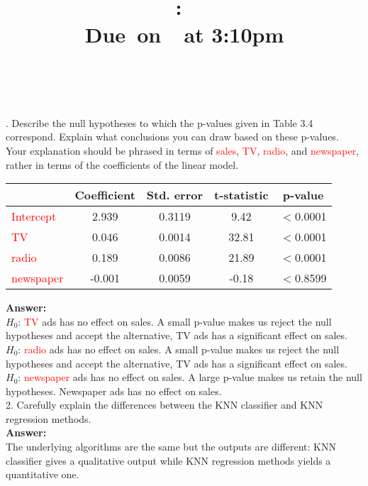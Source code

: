 \documentclass[12pt]{article}
\title{
    \vspace{2in}
    \textmd{\textbf{\hmwkClass:\ \hmwkTitle}}\\
    \normalsize\vspace{0.1in}\small{Due\ on\ \hmwkDueDate\ at 3:10pm}\\
    \vspace{0.1in}\large{\textit{\hmwkClassInstructor\ \hmwkClassTime}}
    \vspace{3in}
}
\author{\textbf{\hmwkAuthorName}}
\date{}
\begin{document}
\maketitle

. Describe the null hypotheses to which the p-values given in Table 3.4 correspond. Explain what conclusions you can draw based on these p-values. Your explanation should be phrased in terms of  \textcolor{red} {sales},  \textcolor{red} {TV}, \textcolor{red} {radio}, and  \textcolor{red} {newspaper}, rather in terms of the coefficients of the linear model. \\

\begin{table}[ht]
\centering
\begin{tabular}{  l | c | c | c |c}
\hline
& Coefficient&Std. error &t-statistic&p-value\\
\hline 
\textcolor{red}{Intercept}& 2.939&0.3119&9.42& $<$0.0001\\
\textcolor{red}{TV}& 0.046&0.0014&32.81& $<$0.0001\\
\textcolor{red}{radio}& 0.189&0.0086&21.89& $<$0.0001\\
\textcolor{red}{newspaper}& -0.001&0.0059&-0.18& $<$0.8599\\
\hline                    
\end{tabular}
\end{table}
\textbf{Answer:}\\      
$H_0$: \textcolor{red}{TV} ads has no effect on sales. A small p-value makes us reject the null hypotheses and accept the alternative, TV ads has a significant effect on sales. \\
$H_0$: \textcolor{red}{radio} ads has no effect on sales. A small p-value makes us reject the null hypotheses and accept the alternative, TV ads has a significant effect on sales. \\
$H_0$: \textcolor{red}{newspaper} ads has no effect on sales. A large p-value makes us retain the null hypotheses. Newspaper ads has no effect on sales. \\

2. Carefully explain the differences between the KNN classifier and KNN regression methods. \\
\textbf{Answer:}\\
The underlying algorithms are the same but the outputs are different: KNN classifier gives a qualitative output while KNN regression methods yields a quantitative one.\\
\end{document}
